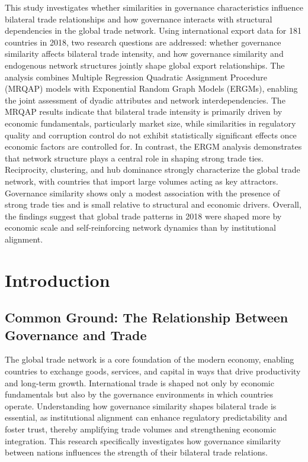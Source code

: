 \documentclass[
]{article}
\begin{document}
This study investigates whether similarities in governance
characteristics influence bilateral trade relationships and how
governance interacts with structural dependencies in the global trade
network. Using international export data for 181 countries in 2018, two
research questions are addressed: whether governance similarity affects
bilateral trade intensity, and how governance similarity and endogenous
network structures jointly shape global export relationships. The
analysis combines Multiple Regression Quadratic Assignment Procedure
(MRQAP) models with Exponential Random Graph Models (ERGMs), enabling
the joint assessment of dyadic attributes and network interdependencies.
The MRQAP results indicate that bilateral trade intensity is primarily
driven by economic fundamentals, particularly market size, while
similarities in regulatory quality and corruption control do not exhibit
statistically significant effects once economic factors are controlled
for. In contrast, the ERGM analysis demonstrates that network structure
plays a central role in shaping strong trade ties. Reciprocity,
clustering, and hub dominance strongly characterize the global trade
network, with countries that import large volumes acting as key
attractors. Governance similarity shows only a modest association with
the presence of strong trade ties and is small relative to structural
and economic drivers. Overall, the findings suggest that global trade
patterns in 2018 were shaped more by economic scale and self-reinforcing
network dynamics than by institutional alignment.

\section{Introduction}\label{introduction}

\subsection{Common Ground: The Relationship Between Governance and
Trade}\label{common-ground-the-relationship-between-governance-and-trade}

The global trade network is a core foundation of the modern economy,
enabling countries to exchange goods, services, and capital in ways that
drive productivity and long-term growth. International trade is shaped
not only by economic fundamentals but also by the governance
environments in which countries operate. Understanding how governance
similarity shapes bilateral trade is essential, as institutional
alignment can enhance regulatory predictability and foster trust,
thereby amplifying trade volumes and strengthening economic integration.
This research specifically investigates how governance similarity
between nations influences the strength of their bilateral trade
relations.
\end{document}
